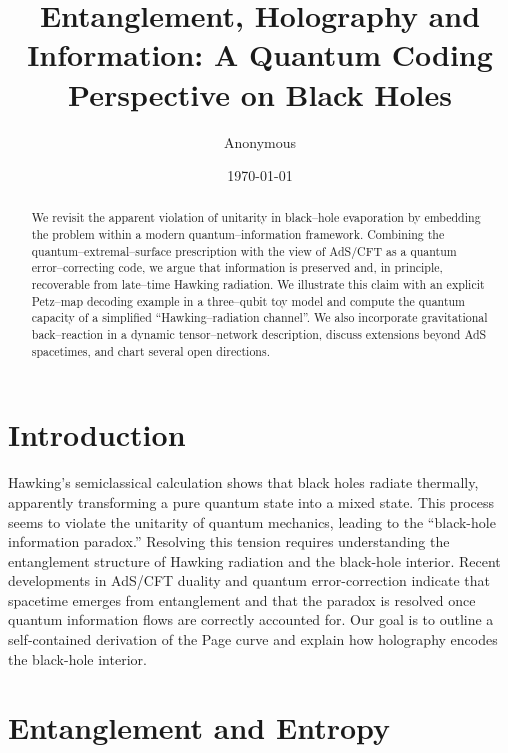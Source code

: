 \documentclass[12pt]{article}
\title{Entanglement, Holography and Information: A Quantum Coding Perspective on Black Holes}
\author{Anonymous}
\date{\today}
\begin{document}
\maketitle

\begin{abstract}
We revisit the apparent violation of unitarity in black--hole evaporation by embedding the problem within a modern quantum--information framework.  Combining the quantum--extremal--surface prescription with the view of AdS/CFT as a quantum error--correcting code, we argue that information is preserved and, in principle, recoverable from late--time Hawking radiation.  We illustrate this claim with an explicit Petz--map decoding example in a three--qubit toy model and compute the quantum capacity of a simplified ``Hawking--radiation channel''.  We also incorporate gravitational back--reaction in a dynamic tensor--network description, discuss extensions beyond AdS spacetimes, and chart several open directions.
\end{abstract}

\section{Introduction}
Hawking’s semiclassical calculation shows that black holes radiate thermally, apparently transforming a pure quantum state into a mixed state.  This process seems to violate the unitarity of quantum mechanics, leading to the ``black-hole information paradox.''  Resolving this tension requires understanding the entanglement structure of Hawking radiation and the black-hole interior.  Recent developments in AdS/CFT duality and quantum error-correction indicate that spacetime emerges from entanglement and that the paradox is resolved once quantum information flows are correctly accounted for.  Our goal is to outline a self-contained derivation of the Page curve and explain how holography encodes the black-hole interior.

\section{Entanglement and Entropy}
\end{document}

